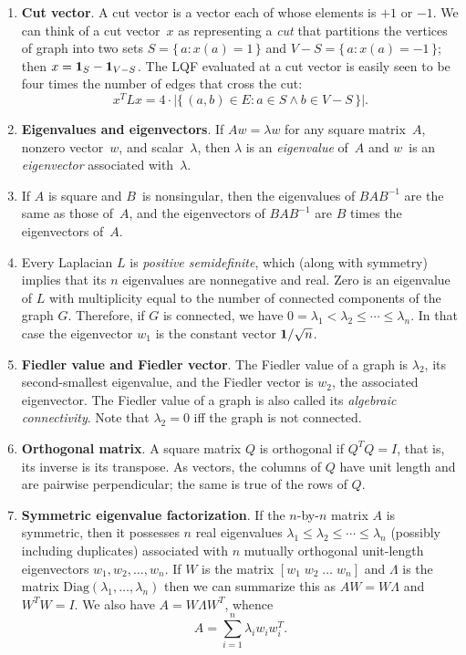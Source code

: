 \documentclass[11pt]{article}
\newcommand{\m}[1]{{\bf{#1}}}       %
\newcommand{\ones}{\m1}             %
\newcommand{\Diag}{\mbox{Diag}}
\begin{document}
\begin{enumerate}
\item{\bf Cut vector}.
A cut vector is a vector each of whose elements is $+1$ or $-1$.
We can think of a cut vector~$x$ as representing a {\em cut} that partitions
the vertices of graph into two sets $S = \{\,a : x(a) = 1\,\}$
and $V-S = \{\,a : x(a) = -1\,\}$;
then $x = \ones_S-\ones_{V-S}$.
The LQF evaluated at a cut vector is easily seen to be four times the number 
of edges that cross the cut:
$$ x^TLx = 4\cdot|\{\,(a,b)\in E : a\in S \wedge b\in V-S\,\}|.$$

\item\label{eig}{\bf Eigenvalues and eigenvectors}.
If $Aw=\lambda w$ for any square matrix~$A$, nonzero vector~$w$, and scalar~$\lambda$, 
then $\lambda$ is an {\em eigenvalue} of~$A$ and $w$~is an {\em eigenvector}
associated with~$\lambda$.

\item
If $A$ is square and $B$~is nonsingular, then the eigenvalues of $BAB^{-1}$ are the
same as those of~$A$, 
and the eigenvectors of $BAB^{-1}$ are $B$ times the eigenvectors of~$A$.

\item
Every Laplacian $L$ is {\em positive semidefinite}, 
which (along with symmetry) implies that its $n$ eigenvalues are nonnegative and real.
Zero is an eigenvalue of $L$ with multiplicity
equal to the number of connected components of the graph $G$.  
Therefore,
if $G$ is connected, we have $0 = \lambda_1 < \lambda_2 \leq \cdots \leq \lambda_n$.
In that case the eigenvector $w_1$ is the constant vector $\ones/\sqrt n$.

\item{\bf Fiedler value and Fiedler vector}.
The Fiedler value of a graph is $\lambda_2$, its second-smallest eigenvalue,
and the Fiedler vector is $w_2$, the associated eigenvector.
The Fiedler value of a graph is also called its {\em algebraic connectivity}.
Note that $\lambda_2=0$ iff the graph is not connected.

\item{\bf Orthogonal matrix}.
A square matrix $Q$ is orthogonal if $Q^TQ=I$, that is, its inverse
is its transpose.  
As vectors, 
the columns of $Q$ have unit length and are pairwise perpendicular; 
the same is true of the rows of $Q$.

\item\label{symeig}{\bf Symmetric eigenvalue factorization}.
If the $n$-by-$n$ matrix $A$ is symmetric, then it possesses $n$ real eigenvalues
$\lambda_1\leq\lambda_2\leq\cdots\leq\lambda_n$ (possibly including duplicates) 
associated with $n$ mutually orthogonal unit-length eigenvectors
$w_1, w_2, \ldots, w_n$.  If $W$ is the matrix $[w_1\; w_2\; \ldots\; w_n]$
and $\Lambda$ is the matrix $\Diag(\lambda_1,\ldots,\lambda_n)$
then we can summarize this as $AW = W\Lambda$ and $W^TW=I$.
We also have $A=W\Lambda W^T$, whence
$$A = \sum_{i=1}^n \lambda_i w_iw_i^T.$$


\end{enumerate}
\end{document}
